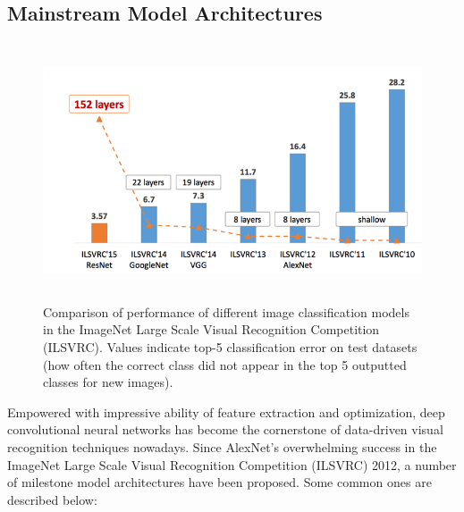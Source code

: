 \documentclass[twoside]{article}
\begin{document}
\subsection{Mainstream Model Architectures}
\begin{figure}[!htb]
\centering
\includegraphics[height = 3in]{pics/netsCompared.png}
\caption{Comparison of performance of different image classification models in the ImageNet Large Scale Visual Recognition Competition (ILSVRC). Values indicate top-5 classification error on test datasets (how often the correct class did not appear in the top 5 outputted classes for new images).}
\label{fig:comparison}
\end{figure}
Empowered with impressive ability of feature extraction and optimization, deep convolutional neural networks has become the cornerstone of data-driven visual recognition techniques nowadays. Since AlexNet's overwhelming success in the ImageNet Large Scale Visual Recognition Competition (ILSVRC) 2012, a number of milestone model architectures have been proposed. Some common ones are described below:
\end{document}
